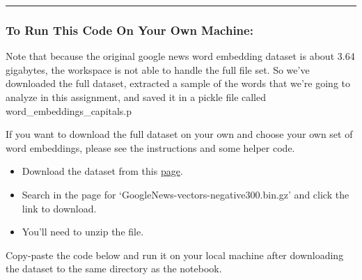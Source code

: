 \documentclass[11pt]{article}
\providecommand{\tightlist}{%
      \setlength{\itemsep}{0pt}\setlength{\parskip}{0pt}}
\begin{document}
    \begin{center}\rule{0.5\linewidth}{0.5pt}\end{center}

\hypertarget{to-run-this-code-on-your-own-machine}{%
\subsubsection{To Run This Code On Your Own
Machine:}\label{to-run-this-code-on-your-own-machine}}

Note that because the original google news word embedding dataset is
about 3.64 gigabytes, the workspace is not able to handle the full file
set. So we've downloaded the full dataset, extracted a sample of the
words that we're going to analyze in this assignment, and saved it in a
pickle file called word\_embeddings\_capitals.p

If you want to download the full dataset on your own and choose your own
set of word embeddings, please see the instructions and some helper
code.

\begin{itemize}
\tightlist
\item
  Download the dataset from this
  \href{https://code.google.com/archive/p/word2vec/}{page}.
\item
  Search in the page for `GoogleNews-vectors-negative300.bin.gz' and
  click the link to download.
\item
  You'll need to unzip the file.
\end{itemize}

    Copy-paste the code below and run it on your local machine after
downloading the dataset to the same directory as the notebook.
\end{document}
